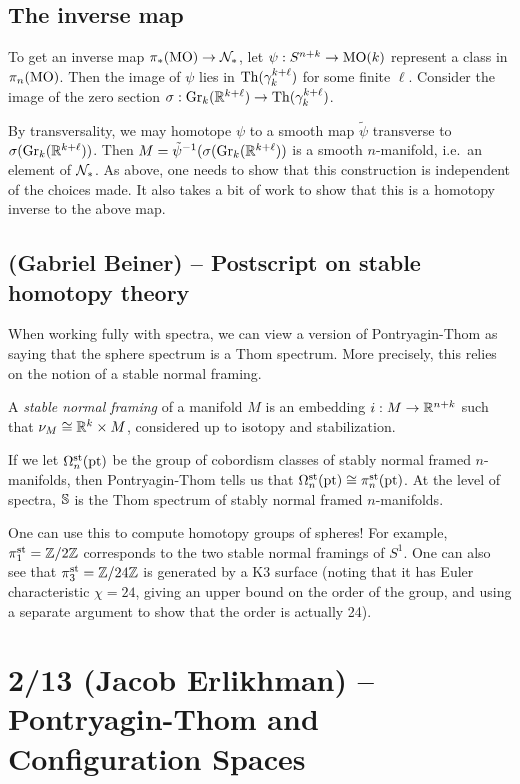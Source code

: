 \documentclass{article}
\begin{document}
\subsection{The inverse map}

To get an inverse map $\pi_*(\mathrm{MO}) \to \mathcal{N}_*$, let $\psi: S^{n+k} \to \mathrm{MO}(k)$ represent a class in $\pi_n(\mathrm{MO})$.
Then the image of $\psi$ lies in $\operatorname{Th}(\gamma_k^{k + \ell})$ for some finite $\ell$.
Consider the image of the zero section $\sigma: \operatorname{Gr}_k(\mathbb{R}^{k+\ell}) \to \operatorname{Th}(\gamma_k^{k + \ell})$.

By transversality, we may homotope $\psi$ to a smooth map $\tilde{\psi}$ transverse to $\sigma(\operatorname{Gr}_k(\mathbb{R}^{k+\ell}))$.
Then $M = \tilde{\psi}^{-1}(\sigma(\operatorname{Gr}_k(\mathbb{R}^{k+\ell}))$ is a smooth $n$-manifold, i.e.\ an element of $\mathcal{N}_*$.
As above, one needs to show that this construction is independent of the choices made.
It also takes a bit of work to show that this is a homotopy inverse to the above map.

\subsection{(Gabriel Beiner) -- Postscript on stable homotopy theory}

When working fully with spectra, we can view a version of Pontryagin-Thom as saying that the sphere spectrum is a Thom spectrum.
More precisely, this relies on the notion of a stable normal framing.

\begin{dfn}
	A \emph{stable normal framing} of a manifold $M$ is an embedding $i: M \to \mathbb{R}^{n+k}$ such that $\nu_M \cong \mathbb{R}^k \times M$, considered up to isotopy and stabilization.
\end{dfn}

If we let $\Omega_n^{\mathrm{st}}(\mathrm{pt})$ be the group of cobordism classes of stably normal framed $n$-manifolds, then Pontryagin-Thom tells us that $\Omega_n^{\mathrm{st}}(\mathrm{pt}) \cong \pi_n^{\mathrm{st}}(\mathrm{pt})$.
At the level of spectra, $\mathbb{S}$ is the Thom spectrum of stably normal framed $n$-manifolds.

One can use this to compute homotopy groups of spheres!
For example, $\pi_1^{\mathrm{st}} = \mathbb{Z} / 2 \mathbb{Z}$ corresponds to the two stable normal framings of $S^1$.
One can also see that $\pi_3^{\mathrm{st}} = \mathbb{Z} / 24 \mathbb{Z}$ is generated by a K3 surface (noting that it has Euler characteristic $\chi = 24$, giving an upper bound on the order of the group, and using a separate argument to show that the order is actually 24).

\section{2/13 (Jacob Erlikhman) -- Pontryagin-Thom and Configuration Spaces}
\end{document}
